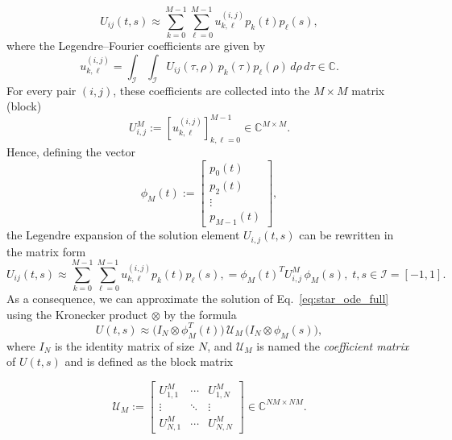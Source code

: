 \documentclass[final,1p,times,number]{elsarticle}
\theoremstyle{plain}%
\begin{document}
\begin{equation}\label{matrixrep}
 U_{ij}(t,s) \approx \sum_{k=0}^{M-1} \sum_{\ell=0}^{M-1} u_{k,\ell}^{(i,j)} p_k(t) p_\ell(s),
\end{equation}
where the Legendre–Fourier coefficients are given by
\begin{equation*}\label{eq:coefficients_final}
u^{(i,j)}_{k,\ell}
   =
   \int_{\mathcal I} \int_{\mathcal I}
        U_{ij}(\tau,\rho)\,
        p_k(\tau)p_\ell(\rho)\, d\rho\, d\tau  \in \mathbb{C}.
\end{equation*}
 For every pair \((i,j)\), these coefficients are collected into the $M \times M$ matrix (block) 
\[ U^M_{i,j} :=
   \left[u_{k,\ell}^{(i,j)}\right]_{k,\ell=0}^{M-1}
   \in \mathbb C^{M\times M}.\]
Hence, defining the vector
\[
\phi_M(t):=
\begin{bmatrix}
p_0(t)\\[0.4ex]
p_2(t)\\[0.4ex]
\vdots\\[0.4ex]
p_{M-1}(t)
\end{bmatrix},
\]
the Legendre expansion of the solution element $U_{i,j}(t,s)$ can be rewritten in the matrix form
\[
 U_{ij}(t,s) \approx \sum_{k=0}^{M-1} \sum_{\ell=0}^{M-1} u_{k,\ell}^{(i,j)} p_k(t) p_\ell(s),
 = \phi_M(t)^{T} {U}_{i,j}^M \, \phi_M(s),\; t,s \in \mathcal I=[-1,1].
\]
As a consequence, we can approximate the solution of Eq.~\eqref{eq:star_ode_full} using the Kronecker product $\otimes$ by the formula
\begin{equation}\label{eq:U_Kronecker}
  U(t,s) \approx \big(I_N \otimes \phi_M^T(t)\big)\,
   \mathcal U_M\,
   \big(I_N \otimes \phi_M(s)\big),    
\end{equation}
where $I_N$ is the identity matrix of size $N$, and \(\mathcal{U}_M\) is named the \emph{coefficient matrix} of \(U(t,s)\) and is defined as the block matrix

\[
\mathcal U_M :=
\begin{bmatrix}
U^M_{1,1} & \cdots & U^M_{1,N}\\
\vdots & \ddots & \vdots\\
U^M_{N,1} & \cdots & U^M_{N,N}
\end{bmatrix}
\in \mathbb C^{NM\times NM}.
\]
\end{document}
